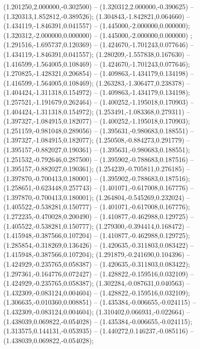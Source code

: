  (1.201250,2.000000,-0.302500) -- (1.320312,2.000000,-0.390625) -- (1.320313,1.852812,-0.389526);
 (1.304843,-1.842821,0.064660) -- (1.434119,-1.846391,0.041557) -- (1.445000,-2.000000,0.000000);
 (1.320312,-2.000000,0.000000) -- (1.445000,-2.000000,0.000000) ;
 (1.291516,-1.695737,0.120369) -- (1.424670,-1.701243,0.077646) -- (1.434119,-1.846391,0.041557);
 (1.280209,-1.557838,0.167630) -- (1.416599,-1.564005,0.108469) -- (1.424670,-1.701243,0.077646);
 (1.270825,-1.428321,0.206854) -- (1.409863,-1.434179,0.134198) -- (1.416599,-1.564005,0.108469);
 (1.263283,-1.306477,0.238378) -- (1.404424,-1.311318,0.154972) -- (1.409863,-1.434179,0.134198);
 (1.257521,-1.191679,0.262464) -- (1.400252,-1.195018,0.170903) -- (1.404424,-1.311318,0.154972);
 (1.253491,-1.083368,0.279311) -- (1.397327,-1.084915,0.182077) -- (1.400252,-1.195018,0.170903);
 (1.251159,-0.981048,0.289056) -- (1.395631,-0.980683,0.188551) -- (1.397327,-1.084915,0.182077);
 (1.250508,-0.884273,0.291779) -- (1.395157,-0.882027,0.190361) -- (1.395631,-0.980683,0.188551);
 (1.251532,-0.792646,0.287500) -- (1.395902,-0.788683,0.187516) -- (1.395157,-0.882027,0.190361);
 (1.254239,-0.705811,0.276185) -- (1.397870,-0.700413,0.180001) -- (1.395902,-0.788683,0.187516);
 (1.258651,-0.623448,0.257743) -- (1.401071,-0.617008,0.167776) -- (1.397870,-0.700413,0.180001);
 (1.264804,-0.545269,0.232024) -- (1.405522,-0.538281,0.150777) -- (1.401071,-0.617008,0.167776);
 (1.272235,-0.470028,0.200490) -- (1.410877,-0.462988,0.129725) -- (1.405522,-0.538281,0.150777);
 (1.279300,-0.394414,0.168472) -- (1.415948,-0.387566,0.107204) -- (1.410877,-0.462988,0.129725);
 (1.285854,-0.318269,0.136426) -- (1.420635,-0.311803,0.083422) -- (1.415948,-0.387566,0.107204);
 (1.291879,-0.241690,0.104396) -- (1.424929,-0.235765,0.058387) -- (1.420635,-0.311803,0.083422);
 (1.297361,-0.164776,0.072427) -- (1.428822,-0.159516,0.032109) -- (1.424929,-0.235765,0.058387);
 (1.302284,-0.087631,0.040563) -- (1.432309,-0.083124,0.004604) -- (1.428822,-0.159516,0.032109);
 (1.306635,-0.010360,0.008851) -- (1.435384,-0.006655,-0.024115) -- (1.432309,-0.083124,0.004604);
 (1.310402,0.066931,-0.022664) -- (1.438039,0.069822,-0.054028) -- (1.435384,-0.006655,-0.024115);
 (1.313575,0.144131,-0.053935) -- (1.440272,0.146237,-0.085116) -- (1.438039,0.069822,-0.054028);
